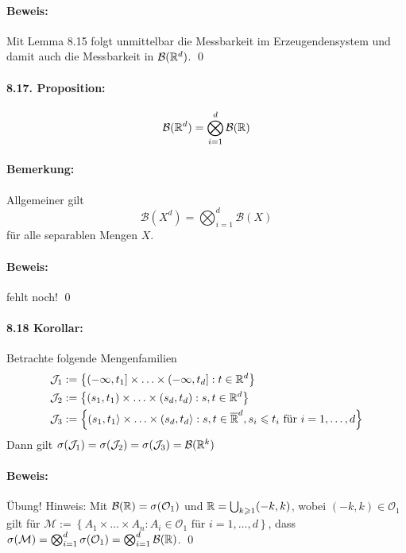 \documentclass[11pt]{report}
\begin{document}
\paragraph{Beweis:} Mit Lemma 8.15 folgt unmittelbar die Messbarkeit im Erzeugendensystem und damit auch die Messbarkeit in $\mathcal{B}(\mathbb{R}^d)$. \qed

\paragraph{8.17. Proposition:}
$$\mathcal{B}(\mathbb{R}^d)=\bigotimes_{i=1}^d\mathcal{B}(\mathbb{R})$$

\paragraph{Bemerkung:}Allgemeiner gilt 
$$\mathcal{B}(X^d)=\bigotimes_{i=1}^d\mathcal{B}(X)$$
f\"ur alle separablen Mengen $X$.

\paragraph{Beweis:}fehlt noch! \qed %

\paragraph{8.18 Korollar:}Betrachte folgende Mengenfamilien
\begin{align*}
    &\mathcal{J}_1:=\left\{(-\infty,t_1]\times\hdots\times(-\infty,t_d]:t\in\mathbb{R}^d\right\} \\
    &\mathcal{J}_2:=\left\{(s_1,t_1)\times\hdots\times(s_d,t_d):s,t\in\mathbb{R}^d\right\} \\
    &\mathcal{J}_3:=\left\{(s_1,t_1\rangle\times\hdots\times(s_d,t_d\rangle:s,t\in\overline{\mathbb{R}}^d,s_i\leqslant t_i\text{ f\"ur }i=1,\hdots,d\right\} \\
\end{align*}
Dann gilt $\sigma(\mathcal{J}_1)=\sigma(\mathcal{J}_2)=\sigma(\mathcal{J}_3)=\mathcal{B}(\mathbb{R}^k)$

\paragraph{Beweis:}\"Ubung! Hinweis: Mit $\mathcal{B}(\mathbb{R})=\sigma(\mathcal{O}_1)$ und $\mathbb{R}=\bigcup_{k\geqslant1}(-k,k)$, wobei $(-k,k)\in\mathcal{O}_1$ gilt f\"ur $\mathcal{M}:=\left\{A_1\times\hdots\times A_n:A_i\in\mathcal{O}_1\text{ f\"ur }i=1,\hdots,d\right\}$, dass $\sigma(\mathcal{M})=\bigotimes_{i=1}^d\sigma(\mathcal{O}_1)=\bigotimes_{i=1}^d\mathcal{B}(\mathbb{R})$. \qed
\end{document}
